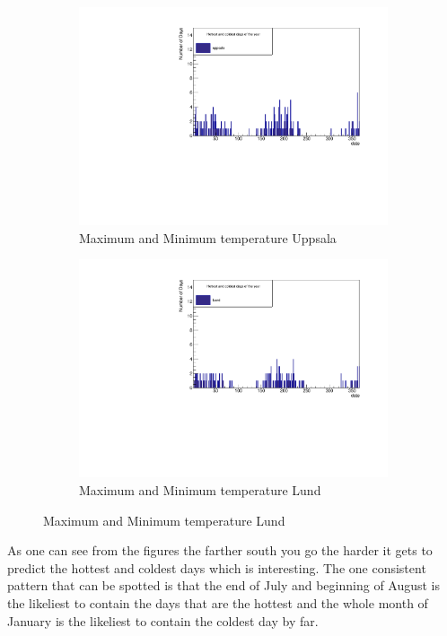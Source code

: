 \documentclass[aps,prl,groupedaddress,twocolumn]{revtex4-1}
\begin{document}
\begin{figure}[h!]
    \vspace{-0.0cm}
    \begin{subfigure}{0.45\textwidth}
            \includegraphics[width=\textwidth,trim= 0 0 0 0.6cm,clip]{MinMaxuppsala.pdf}
            \vspace{-0.6cm}
            \caption{Maximum and Minimum temperature Uppsala}
            \label{fig:MinMaxUppsala}
    \end{subfigure}
    \begin{subfigure}{0.45\textwidth}
            \includegraphics[width=\textwidth,trim= 0 0 0 0.6cm,clip]{MinMaxLund.pdf}
            \vspace{-0.6cm}
            \caption{Maximum and Minimum temperature Lund}
            \label{fig:MinMaxLund}
    \end{subfigure}

\end{figure}
As one can see from the figures the farther south you go the harder it gets to predict the hottest and coldest days which is interesting. The one consistent pattern that can be spotted is that the end of July and beginning of August is the likeliest to contain the days that are the hottest and the whole month of January is the likeliest to contain the coldest day by far.
\end{document}
